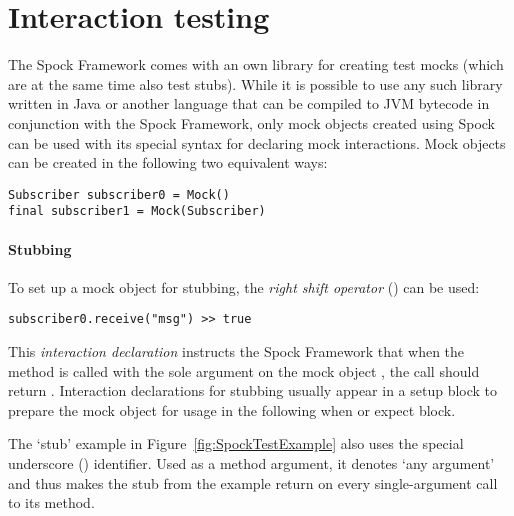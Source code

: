 \section{Interaction testing}
The Spock Framework comes with an own library
for creating test mocks
(which are at the same time also test stubs).
While it is possible to use any such library
written in Java or another language
that can be compiled to JVM bytecode
in conjunction with the Spock Framework,
only mock objects created using Spock
can be used with its special syntax
for declaring mock interactions.
Mock objects can be created in the following two equivalent ways:
\autocite[Chapter: Interaction Based Testing - Creating Mock Objects]{SpockFrameworkDoc}
\begin{verbatim}
Subscriber subscriber0 = Mock()
final subscriber1 = Mock(Subscriber)
\end{verbatim}

\paragraph{Stubbing}
To set up a mock object for stubbing,
the \textit{right shift operator} (\code{<<}) can be used:
\begin{verbatim}
subscriber0.receive("msg") >> true
\end{verbatim}

This \textit{interaction declaration} instructs the Spock Framework that when
the method  is called with
the sole argument  on
the mock object ,
the call should return .
Interaction declarations for stubbing usually appear in a setup block
to prepare the mock object for usage in the following when or expect block.

The `stub' example in Figure~\ref{fig:SpockTestExample}
also uses the special underscore (\code{_}) identifier.
Used as a method argument, it denotes `any argument'
and thus makes the stub from the example return 
on every single-argument call to its  method.
